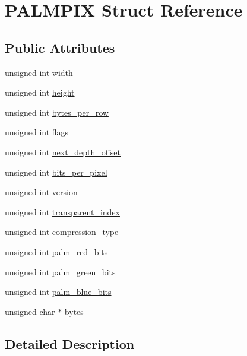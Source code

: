 \hypertarget{structPALMPIX}{\section{P\+A\+L\+M\+P\+I\+X Struct Reference}
\label{structPALMPIX}
}
\subsection*{Public Attributes}
\begin{DoxyCompactItemize}
\item 
unsigned int \hyperlink{structPALMPIX_a3c919d9d9bdf0bfdf67c7eb1f2c5a394}{width}
\item 
unsigned int \hyperlink{structPALMPIX_aeb2458e16e733418d1897ea577f539df}{height}
\item 
unsigned int \hyperlink{structPALMPIX_af1a24f1ea6245a31aaba0a247f5f9488}{bytes\+\_\+per\+\_\+row}
\item 
unsigned int \hyperlink{structPALMPIX_a7159c9ddf91b7e3c6300e4100adbd6e5}{flags}
\item 
unsigned int \hyperlink{structPALMPIX_a53bf150bd435a6aeadff69c8d025266d}{next\+\_\+depth\+\_\+offset}
\item 
unsigned int \hyperlink{structPALMPIX_aa3505215b23213464cbdd7058e906571}{bits\+\_\+per\+\_\+pixel}
\item 
unsigned int \hyperlink{structPALMPIX_a888fae9071575df1390d9dd301539f1f}{version}
\item 
unsigned int \hyperlink{structPALMPIX_a991dabc462c6bb8c229d5c6f2789a9ea}{transparent\+\_\+index}
\item 
unsigned int \hyperlink{structPALMPIX_a465da1cce6c60b201fcb17d48f793f79}{compression\+\_\+type}
\item 
unsigned int \hyperlink{structPALMPIX_a6afa309bd0d1f0e02e300fd4f059d0fd}{palm\+\_\+red\+\_\+bits}
\item 
unsigned int \hyperlink{structPALMPIX_a3640472263931e77689b659a3bb030f8}{palm\+\_\+green\+\_\+bits}
\item 
unsigned int \hyperlink{structPALMPIX_abd2f75ac5d479323c3c0998940b0f17a}{palm\+\_\+blue\+\_\+bits}
\item 
unsigned char $\ast$ \hyperlink{structPALMPIX_a5830c51eb001f0889defa52bb7e540c2}{bytes}
\end{DoxyCompactItemize}


\subsection{Detailed Description}


